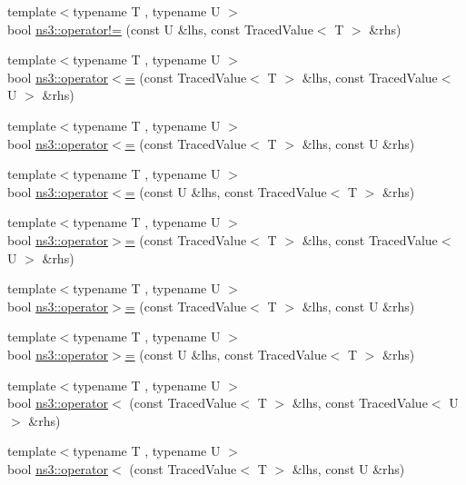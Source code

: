 \begin{DoxyCompactItemize}
\item 
{\footnotesize template$<$typename T , typename U $>$ }\\bool \hyperlink{group__tracing_gaf51f6117120d2bd99aa3a5706549336f}{ns3\+::operator!=} (const U \&lhs, const Traced\+Value$<$ T $>$ \&rhs)
\item 
{\footnotesize template$<$typename T , typename U $>$ }\\bool \hyperlink{group__tracing_ga53ba0e46ad28e628394cbdb9520ef285}{ns3\+::operator$<$=} (const Traced\+Value$<$ T $>$ \&lhs, const Traced\+Value$<$ U $>$ \&rhs)
\item 
{\footnotesize template$<$typename T , typename U $>$ }\\bool \hyperlink{group__tracing_ga1d48b5c482c58e392a481775efdab9d8}{ns3\+::operator$<$=} (const Traced\+Value$<$ T $>$ \&lhs, const U \&rhs)
\item 
{\footnotesize template$<$typename T , typename U $>$ }\\bool \hyperlink{group__tracing_ga3391447d64b67baaedb34cd87e538487}{ns3\+::operator$<$=} (const U \&lhs, const Traced\+Value$<$ T $>$ \&rhs)
\item 
{\footnotesize template$<$typename T , typename U $>$ }\\bool \hyperlink{group__tracing_ga049c8b34ae1b4a36aca00d229364d165}{ns3\+::operator$>$=} (const Traced\+Value$<$ T $>$ \&lhs, const Traced\+Value$<$ U $>$ \&rhs)
\item 
{\footnotesize template$<$typename T , typename U $>$ }\\bool \hyperlink{group__tracing_gaba33e320b013d25577afbc8a814d5aab}{ns3\+::operator$>$=} (const Traced\+Value$<$ T $>$ \&lhs, const U \&rhs)
\item 
{\footnotesize template$<$typename T , typename U $>$ }\\bool \hyperlink{group__tracing_gafdd3babca6d4693bb77d4f348b59d79f}{ns3\+::operator$>$=} (const U \&lhs, const Traced\+Value$<$ T $>$ \&rhs)
\item 
{\footnotesize template$<$typename T , typename U $>$ }\\bool \hyperlink{group__tracing_ga6a4efa69eef34b239e0167de71730cc4}{ns3\+::operator$<$} (const Traced\+Value$<$ T $>$ \&lhs, const Traced\+Value$<$ U $>$ \&rhs)
\item 
{\footnotesize template$<$typename T , typename U $>$ }\\bool \hyperlink{group__tracing_ga93fb34d76c9306aad2a00ce0aef96441}{ns3\+::operator$<$} (const Traced\+Value$<$ T $>$ \&lhs, const U \&rhs)

\end{DoxyCompactItemize}
